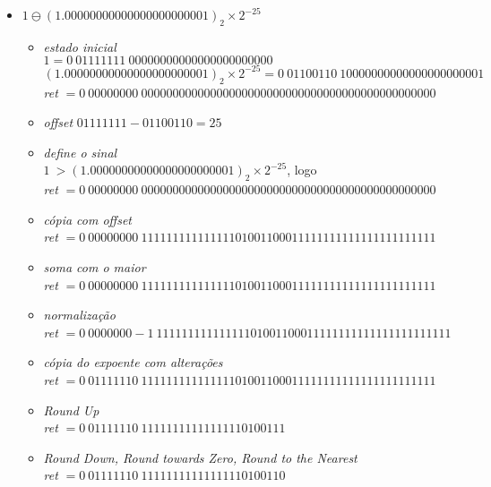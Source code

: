 \documentclass{article}
\begin{document}
\begin{itemize}
\item $1 \ominus {(1.00000000000000000000001)}_{2} \times 2^{-25}$
    \begin{itemize}
        
    \item \textit{estado inicial} \\    
    $1 = {0}\ {01111111}\ {00000000000000000000000}$ \\
    ${(1.00000000000000000000001)}_{2} \times 2^{-25} = {0}\ {01100110}\ {10000000000000000000001}$ \\
    \textit{ret} $= {0}\ {00000000}\ {00000000000000000000000000000000000000000000000}$ \\

    \item \textit{offset} $ {01111111} - {01100110} = 25$
    
    \item \textit{define o sinal} \\
    $1\ > {(1.00000000000000000000001)}_{2} \times 2^{-25}$, logo \\
    \textit{ret} $= {0}\ {00000000}\ {00000000000000000000000000000000000000000000000}$ \\
      
    \item \textit{cópia com offset} \\
    \textit{ret} $= {0}\ {00000000}\ {11111111111111101001100011111111111111111111111}$ \\
      
    \item \textit{soma com o maior} \\
    \textit{ret} $= {0}\ {00000000}\ {11111111111111101001100011111111111111111111111}$ \\

    \item \textit{normalização} \\
    \textit{ret} $= {0}\ {0000000-1}\ {11111111111111101001100011111111111111111111111}$ \\
    
    \item \textit{cópia do expoente com alterações} \\
    \textit{ret} $= {0}\ {01111110}\ {11111111111111101001100011111111111111111111111}$ \\
    
    \item \textit{Round Up} \\
    \textit{ret} $= {0}\ {01111110}\ {11111111111111110100111}$

    \item \textit{Round Down, Round towards Zero, Round to the Nearest} \\
    \textit{ret} $= {0}\ {01111110}\ {11111111111111110100110}$
    \end{itemize}
\end{itemize}
\end{document}
